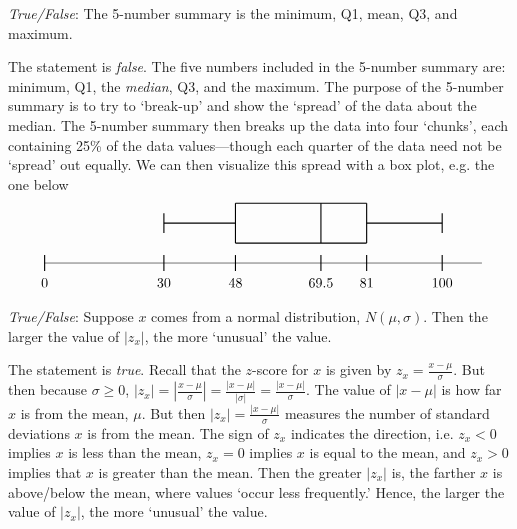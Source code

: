\documentclass[11pt,letterpaper]{article}
\begin{document}
\quizsol \textit{True/False}: The 5-number summary is the minimum, Q1, mean, Q3, and maximum. \pspace

\sol The statement is \textit{false}. The five numbers included in the 5-number summary are: minimum, Q1, the \textit{median}, Q3, and the maximum. The purpose of the 5-number summary is to try to `break-up' and show the `spread' of the data about the median. The 5-number summary then breaks up the data into four `chunks', each containing 25\% of the data values---though each quarter of the data need not be `spread' out equally. We can then visualize this spread with a box plot, e.g. the one below
	\[
	\begin{tikzpicture}
	\draw (0,0) -- (11,0);
	\draw[thick] (3,1) -- (4.8,1);
	\draw[thick] (8.1,1) -- (10,1);
	
	\draw[thick] (3,0.75) -- (3,1.25);
	\draw[thick] (10,0.75) -- (10,1.25);
	
	\draw[thick] (4.8,0.5) -- (4.8,1.5);
	\draw[thick] (6.95,0.5) -- (6.95,1.5);
	\draw[thick] (8.1,0.5) -- (8.1,1.5);
	
	\draw[thick] (4.8,1.5) -- (8.1,1.5);
	\draw[thick] (4.8,0.5) -- (8.1,0.5);
	
	\draw[thick] (0,-0.2) -- (0,0.2);
	\node at (0,-0.5) {0}; 

	\draw[thick] (10,-0.2) -- (10,0.2);
	\node at (10,-0.5) {100}; 

	\draw[thick] (3,-0.2) -- (3,0.2);
	\node at (3,-0.5) {30}; 

	\draw[thick] (4.8,-0.2) -- (4.8,0.2);
	\node at (4.8,-0.5) {48}; 

	\draw[thick] (6.95,-0.2) -- (6.95,0.2);
	\node at (6.95,-0.5) {69.5}; 

	\draw[thick] (8.1,-0.2) -- (8.1,0.2);
	\node at (8.1,-0.5) {81}; 
		
	\end{tikzpicture}
	\] \pvspace{1.6cm}



\quizsol \textit{True/False}: Suppose $x$ comes from a normal distribution, $N(\mu, \sigma)$. Then the larger the value of $|z_x|$, the more `unusual' the value. \pspace

\sol The statement is \textit{true}. Recall that the $z$-score for $x$ is given by $z_x= \frac{x - \mu}{\sigma}$. But then because $\sigma \geq 0$, $|z_x|= \left| \frac{x - \mu}{\sigma} \right|= \frac{|x - \mu|}{|\sigma|}= \frac{|x - \mu|}{\sigma}$. The value of $|x - \mu|$ is how far $x$ is from the mean, $\mu$. But then $|z_x|= \frac{|x - \mu|}{\sigma}$ measures the number of standard deviations $x$ is from the mean. The sign of $z_x$ indicates the direction, i.e. $z_x < 0$ implies $x$ is less than the mean, $z_x= 0$ implies $x$ is equal to the mean, and $z_x > 0$ implies that $x$ is greater than the mean. Then the greater $|z_x|$ is, the farther $x$ is above/below the mean, where values `occur less frequently.' Hence, the larger the value of $|z_x|$, the more `unusual' the value. \pvspace{1.8cm}
\end{document}
